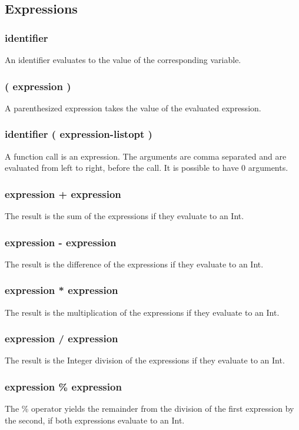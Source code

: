 \documentclass[12pt]{article}
\begin{document}
\subsection{Expressions}
\subsubsection{identifier}
An identifier evaluates to the value of the corresponding variable.

\subsubsection{( expression )}
A parenthesized expression takes the value of the evaluated expression.

\subsubsection{identifier ( expression-listopt )}
A function call is an expression. The arguments are comma separated and are evaluated
from left to right, before the call. It is possible to have 0 arguments.

\subsubsection{expression + expression}
The result is the sum of the expressions if they evaluate to an Int.

\subsubsection{expression - expression}
The result is the difference of the expressions if they evaluate to an Int.

\subsubsection{expression * expression}
The result is the multiplication of the expressions if they evaluate to an Int.

\subsubsection{expression / expression}
The result is the Integer division of the expressions if they evaluate to an Int.

\subsubsection{expression \% expression}
The \% operator yields the remainder from the division of the first expression by the second, if
both expressions evaluate to an Int.
\end{document}
